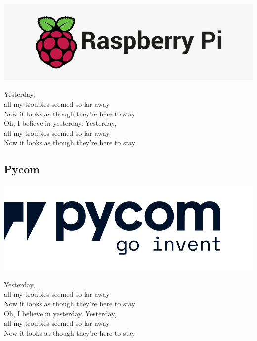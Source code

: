 \noindent
\begin{minipage}{0.5\textwidth}%
	\includegraphics[width=\textwidth]{resources/img/51-513503_pi-raspberry-pi-logo}
\end{minipage}%
\hfill%
\begin{minipage}{0.55\textwidth}\raggedright
	Yesterday,\\
	all my troubles seemed so far away\\
	Now it looks as though they're here to stay\\
	Oh, I believe in yesterday.				Yesterday,\\
	all my troubles seemed so far away\\
	Now it looks as though they're here to stay\\
\end{minipage}	

\subsection{Pycom}

\noindent
\begin{minipage}{0.5\textwidth}%
	\includegraphics[width=\textwidth]{resources/img/pycom-logo-new-rp1}
\end{minipage}%
\hfill%
\begin{minipage}{0.55\textwidth}\raggedright
	Yesterday,\\
	all my troubles seemed so far away\\
	Now it looks as though they're here to stay\\
	Oh, I believe in yesterday.				Yesterday,\\
	all my troubles seemed so far away\\
	Now it looks as though they're here to stay\\
\end{minipage}

